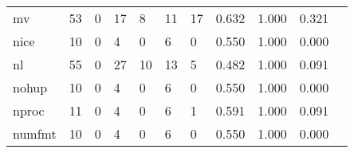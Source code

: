 \begin{longtable}{lp{1.2cm}p{1.2cm}p{1.2cm}p{1.2cm}p{1.2cm}p{1.2cm}p{1.2cm}p{1.2cm}p{1.2cm}p{1.2cm}}
mv        &                                    53 &                                                  0 &                                                 17 &                                                  8 &                                                 11 &                                                 17 &                                              0.632 &                                              1.000 &                                              0.321 \\
nice      &                                    10 &                                                  0 &                                                  4 &                                                  0 &                                                  6 &                                                  0 &                                              0.550 &                                              1.000 &                                              0.000 \\
nl        &                                    55 &                                                  0 &                                                 27 &                                                 10 &                                                 13 &                                                  5 &                                              0.482 &                                              1.000 &                                              0.091 \\
nohup     &                                    10 &                                                  0 &                                                  4 &                                                  0 &                                                  6 &                                                  0 &                                              0.550 &                                              1.000 &                                              0.000 \\
nproc     &                                    11 &                                                  0 &                                                  4 &                                                  0 &                                                  6 &                                                  1 &                                              0.591 &                                              1.000 &                                              0.091 \\
numfmt    &                                    10 &                                                  0 &                                                  4 &                                                  0 &                                                  6 &                                                  0 &                                              0.550 &                                              1.000 &                                              0.000 \\

\end{longtable}
